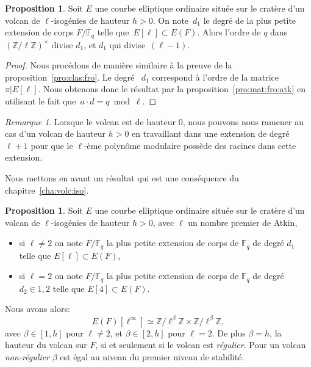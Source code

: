 \documentclass[10pt,a4paper]{book}
\theoremstyle{plain}
\theoremstyle{definition}
\theoremstyle{definition}
\theoremstyle{definition}
\theoremstyle{definition}
\newtheorem{prop}[thm]{Proposition}
\theoremstyle{definition}
\theoremstyle{remark}
\newtheorem{rem}[thm]{Remarque}
\theoremstyle{remark}
\theoremstyle{definition}
\begin{document}

\begin{prop}
Soit $E$ une courbe elliptique ordinaire située sur le cratère d'un 
volcan de $\ell$-isogénies de hauteur $h>0$. On note~$d_1$ le degré de la plus 
petite extension de corps $F/\mathbb{F}_q$ telle que~$E[\ell]\subset E(F)$. 
Alors l'ordre de $q$ dans $(\mathbb{Z}/ \ell \mathbb{Z})^\times$ divise $d_1$,
et $d_1$ qui divise~$(\ell-1)$.
\end{prop}

\begin{proof}
Nous procédons de manière similaire à la preuve de la proposition~\ref{pro:clas:fro}.
Le degré ~$d_1$ correspond à l'ordre de la matrice~$\pi|E[\ell]$.
Nous obtenons donc le résultat par la proposition~\ref{pro:mat:fro:atk} en 
utilisant le fait que~$a \cdot d = q \bmod \ell$. 
\end{proof}

\begin{rem}
\label{rem:hau:atk}
Lorsque le volcan est de hauteur $0$, nous pouvons nous ramener au cas d'un 
volcan de hauteur $h>0$ en travaillant dans une extension de degré $\ell+1$ 
pour que le $\ell$-ème polynôme modulaire possède des racines dans cette 
extension.
\end{rem}

Nous mettons en avant un résultat qui est une conséquence du 
chapitre~\ref{cha:volc:iso}. 

\begin{prop}
\label{pro:atk:d1}
Soit $E$ une courbe elliptique ordinaire située sur le cratère d'un 
volcan de $\ell$-isogénies de hauteur $h>0$, avec $\ell$ un nombre premier 
de Atkin,
\begin{itemize}
\item si $\ell \neq 2$ on note $F/\mathbb{F}_q$ la 
plus petite extension de corps de $\mathbb{F}_q$ de degré $d_1$ telle que 
$E[\ell] \subset E(F)$,
\item si $\ell=2$ on note $F/\mathbb{F}_q$ la 
plus petite extension de corps de $\mathbb{F}_q$ de degré $d_2 \in {1,2}$ telle
que $E[4] \subset E(F)$.
\end{itemize}
Nous avons alors:
\[
E(F)[\ell^{\infty}] \simeq \mathbb{Z}/ \ell^{\beta} \mathbb{Z} \times \mathbb{Z}/ \ell^{\beta} \mathbb{Z}, 
\]
avec $\beta \in [1,h]$ pour $\ell \neq 2$, et $\beta \in [2,h]$ pour $\ell=2$. De 
plus $\beta=h$, la hauteur du volcan sur $F$, si et seulement si le volcan est \emph{régulier}.
Pour un volcan \emph{non-régulier} $\beta$ est égal au niveau du premier niveau de stabilité. 
\end{prop}
\end{document}

